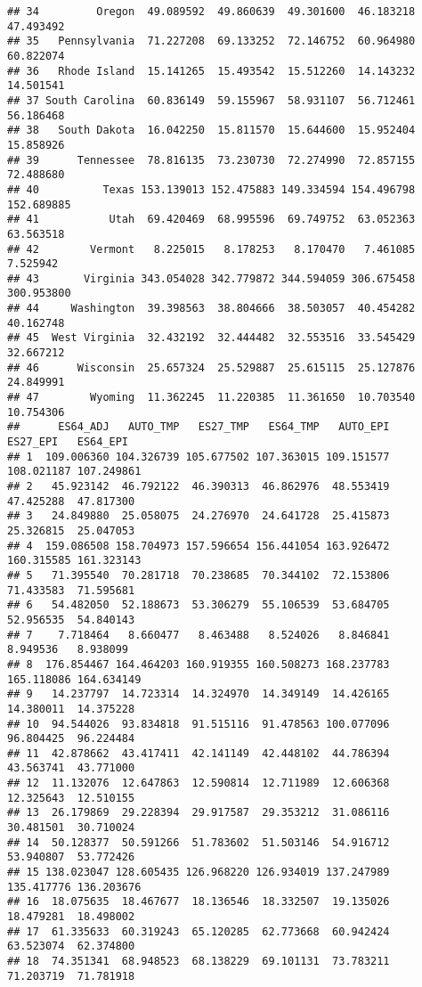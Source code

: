 \documentclass[
]{article}
\begin{document}
\begin{verbatim}
## 34         Oregon  49.089592  49.860639  49.301600  46.183218  47.493492
## 35   Pennsylvania  71.227208  69.133252  72.146752  60.964980  60.822074
## 36   Rhode Island  15.141265  15.493542  15.512260  14.143232  14.501541
## 37 South Carolina  60.836149  59.155967  58.931107  56.712461  56.186468
## 38   South Dakota  16.042250  15.811570  15.644600  15.952404  15.858926
## 39      Tennessee  78.816135  73.230730  72.274990  72.857155  72.488680
## 40          Texas 153.139013 152.475883 149.334594 154.496798 152.689885
## 41           Utah  69.420469  68.995596  69.749752  63.052363  63.563518
## 42        Vermont   8.225015   8.178253   8.170470   7.461085   7.525942
## 43       Virginia 343.054028 342.779872 344.594059 306.675458 300.953800
## 44     Washington  39.398563  38.804666  38.503057  40.454282  40.162748
## 45  West Virginia  32.432192  32.444482  32.553516  33.545429  32.667212
## 46      Wisconsin  25.657324  25.529887  25.615115  25.127876  24.849991
## 47        Wyoming  11.362245  11.220385  11.361650  10.703540  10.754306
##      ES64_ADJ   AUTO_TMP   ES27_TMP   ES64_TMP   AUTO_EPI   ES27_EPI   ES64_EPI
## 1  109.006360 104.326739 105.677502 107.363015 109.151577 108.021187 107.249861
## 2   45.923142  46.792122  46.390313  46.862976  48.553419  47.425288  47.817300
## 3   24.849880  25.058075  24.276970  24.641728  25.415873  25.326815  25.047053
## 4  159.086508 158.704973 157.596654 156.441054 163.926472 160.315585 161.323143
## 5   71.395540  70.281718  70.238685  70.344102  72.153806  71.433583  71.595681
## 6   54.482050  52.188673  53.306279  55.106539  53.684705  52.956535  54.840143
## 7    7.718464   8.660477   8.463488   8.524026   8.846841   8.949536   8.938099
## 8  176.854467 164.464203 160.919355 160.508273 168.237783 165.118086 164.634149
## 9   14.237797  14.723314  14.324970  14.349149  14.426165  14.380011  14.375228
## 10  94.544026  93.834818  91.515116  91.478563 100.077096  96.804425  96.224484
## 11  42.878662  43.417411  42.141149  42.448102  44.786394  43.563741  43.771000
## 12  11.132076  12.647863  12.590814  12.711989  12.606368  12.325643  12.510155
## 13  26.179869  29.228394  29.917587  29.353212  31.086116  30.481501  30.710024
## 14  50.128377  50.591266  51.783602  51.503146  54.916712  53.940807  53.772426
## 15 138.023047 128.605435 126.968220 126.934019 137.247989 135.417776 136.203676
## 16  18.075635  18.467677  18.136546  18.332507  19.135026  18.479281  18.498002
## 17  61.335633  60.319243  65.120285  62.773668  60.942424  63.523074  62.374800
## 18  74.351341  68.948523  68.138229  69.101131  73.783211  71.203719  71.781918

\end{verbatim}
\end{document}
